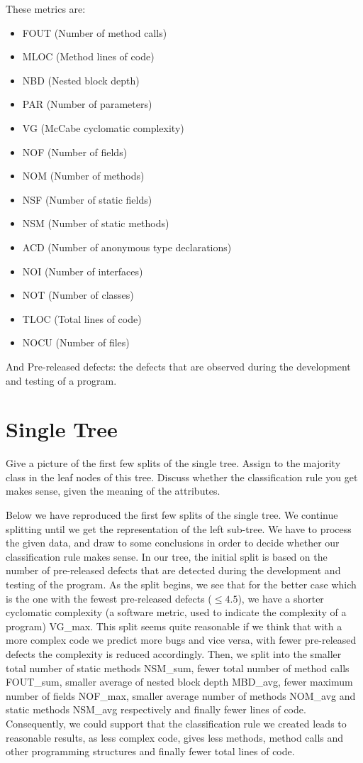 \documentclass[a4paper,12pt]{article}
\begin{document}
 These metrics are: 
 \begin{itemize}
 \item FOUT      (Number of method calls) 
 \item MLOC     (Method lines of code)
 \item NBD        (Nested block depth)
 \item PAR        (Number of parameters) 
 \item VG          (McCabe cyclomatic complexity)
 \item NOF        (Number of fields)
 \item NOM       (Number of methods) 
 \item NSF        (Number of static fields)
 \item NSM       (Number of static methods)
 \item ACD       (Number of anonymous type declarations)
 \item NOI        (Number of interfaces)
 \item NOT       (Number of classes)
 \item TLOC     (Total lines of code)
 \item NOCU    (Number of files)
 \end{itemize}
And Pre-released defects: the defects that are observed during the development and testing of a program. 

\section{Single Tree}
Give a picture of the first few splits of the single tree. Assign to the majority class in the leaf nodes of this tree. Discuss whether the classification rule you get makes sense, given the meaning of the attributes. 

 Below we have reproduced the first few splits of the single tree. We continue splitting until we get the representation of the left sub-tree. We have to process the given data, and draw to some conclusions in order to decide whether our classification rule makes sense. In our tree, the initial split is based on the number of pre-released defects that are detected during the development and testing of the program. As the split begins, we see that for the better case which is the one with the fewest pre-released defects ($\leq 4.5$), we have a shorter cyclomatic complexity (a software metric, used to indicate the complexity of a program) VG\_max. This split seems quite reasonable if we think that with a more complex code we predict more bugs and vice versa, with fewer pre-released defects the complexity is reduced accordingly. Then, we split into the smaller total number of static methods NSM\_sum, fewer total number of method calls FOUT\_sum, smaller average of nested block depth MBD\_avg, fewer maximum number of fields NOF\_max, smaller average number of methods NOM\_avg and static methods NSM\_avg respectively and finally fewer lines of code. Consequently, we could support that the classification rule we created leads to reasonable results, as less complex code, gives less methods, method calls and other programming structures and finally fewer total lines of code. 
\end{document}
